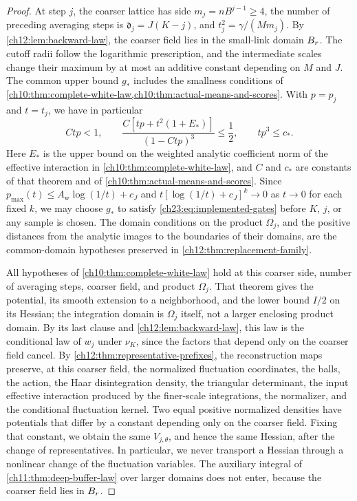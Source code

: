 \begin{proof}
At step $j$, the coarser lattice has side $m_j=nB^{j-1}\ge4$, the number of preceding averaging steps is $\mathfrak d_j=J(K-j)$, and $t_j^2=\gamma/(Mm_j)$. By \cref{ch12:lem:backward-law}, the coarser field lies in the small-link domain $B_{r}$. The cutoff radii follow the logarithmic prescription, and the intermediate scales change their maximum by at most an additive constant depending on $M$ and $J$. The common upper bound $g_*$ includes the smallness conditions of \cref{ch10:thm:complete-white-law,ch10:thm:actual-means-and-scores}. With $p=p_j$ and $t=t_j$, we have in particular
\begin{equation}\label{ch23:eq:implemented-gates}
 Ctp<1,\qquad
 \frac{C[tp+t^2(1+E_*)]}{(1-Ctp)^3}\le\frac12,
 \qquad tp^3\le c_* .
\end{equation}
Here $E_*$ is the upper bound on the weighted analytic coefficient norm of the effective interaction in \cref{ch10:thm:complete-white-law}, and $C$ and $c_*$ are constants of that theorem and of \cref{ch10:thm:actual-means-and-scores}. Since $p_{\max}(t)\le A_{\mathrm w}\log(1/t)+c_J$ and $t[\log(1/t)+c_J]^k\to0$ as $t\to0$ for each fixed $k$, we may choose $g_*$ to satisfy \eqref{ch23:eq:implemented-gates} before $K$, $j$, or any sample is chosen. The domain conditions on the product $\Omega_j$, and the positive distances from the analytic images to the boundaries of their domains, are the common-domain hypotheses preserved in \cref{ch12:thm:replacement-family}.

All hypotheses of \cref{ch10:thm:complete-white-law} hold at this coarser side, number of averaging steps, coarser field, and product $\Omega_j$. That theorem gives the potential, its smooth extension to a neighborhood, and the lower bound $I/2$ on its Hessian; the integration domain is $\Omega_j$ itself, not a larger enclosing product domain. By its last clause and \cref{ch12:lem:backward-law}, this law is the conditional law of $w_j$ under $\nu_K$, since the factors that depend only on the coarser field cancel. By \cref{ch12:thm:representative-prefixes}, the reconstruction maps preserve, at this coarser field, the normalized fluctuation coordinates, the balls, the action, the Haar disintegration density, the triangular determinant, the input effective interaction produced by the finer-scale integrations, the normalizer, and the conditional fluctuation kernel. Two equal positive normalized densities have potentials that differ by a constant depending only on the coarser field. Fixing that constant, we obtain the same $V_{j,\theta}$, and hence the same Hessian, after the change of representatives. In particular, we never transport a Hessian through a nonlinear change of the fluctuation variables. The auxiliary integral of \cref{ch11:thm:deep-buffer-law} over larger domains does not enter, because the coarser field lies in $B_{r}$.


\end{proof}
